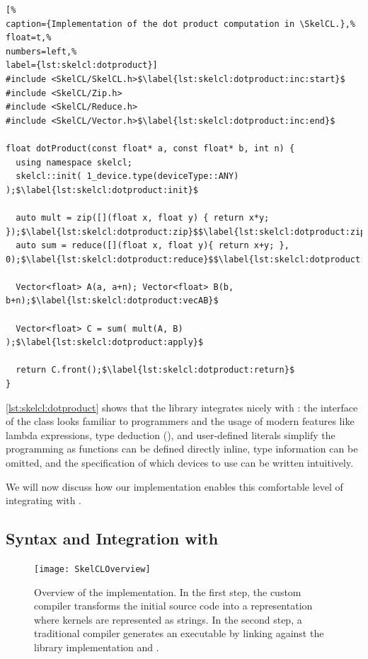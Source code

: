\begin{lstlisting}[%
caption={Implementation of the dot product computation in \SkelCL.},%
float=t,%
numbers=left,%
label={lst:skelcl:dotproduct}]
#include <SkelCL/SkelCL.h>$\label{lst:skelcl:dotproduct:inc:start}$
#include <SkelCL/Zip.h>
#include <SkelCL/Reduce.h>
#include <SkelCL/Vector.h>$\label{lst:skelcl:dotproduct:inc:end}$

float dotProduct(const float* a, const float* b, int n) {
  using namespace skelcl;
  skelcl::init( 1_device.type(deviceType::ANY) );$\label{lst:skelcl:dotproduct:init}$

  auto mult = zip([](float x, float y) { return x*y; });$\label{lst:skelcl:dotproduct:zip}$$\label{lst:skelcl:dotproduct:zip:lambda}$
  auto sum = reduce([](float x, float y){ return x+y; }, 0);$\label{lst:skelcl:dotproduct:reduce}$$\label{lst:skelcl:dotproduct:reduce:lambda}$

  Vector<float> A(a, a+n); Vector<float> B(b, b+n);$\label{lst:skelcl:dotproduct:vecAB}$

  Vector<float> C = sum( mult(A, B) );$\label{lst:skelcl:dotproduct:apply}$

  return C.front();$\label{lst:skelcl:dotproduct:return}$
}
\end{lstlisting}

\autoref{lst:skelcl:dotproduct} shows that the \SkelCL library integrates nicely with \Cpp:
the interface of the  class looks familiar to \Cpp programmers and the usage of modern \Cpp features like lambda expressions, type deduction (), and user-defined literals simplify the programming as functions can be defined directly inline, type information can be omitted, and the specification of which devices to use can be written intuitively.

We will now discuss how our implementation enables this comfortable level of integrating \SkelCL with \Cpp.










\subsection{Syntax and Integration with \Cpp}
\label{section:skelcl-library:syntax}

\begin{figure}[p]
  \centering
  \texttt{[image: SkelCLOverview]}
  \caption{Overview of the \SkelCL implementation.
    In the first step, the custom  compiler transforms the initial source code into a representation where kernels are represented as strings.
    In the second step, a traditional \Cpp compiler generates an executable by linking against the \SkelCL library implementation and \OpenCL.}
  \label{fig:skelcl:impl:overview}
\end{figure}


